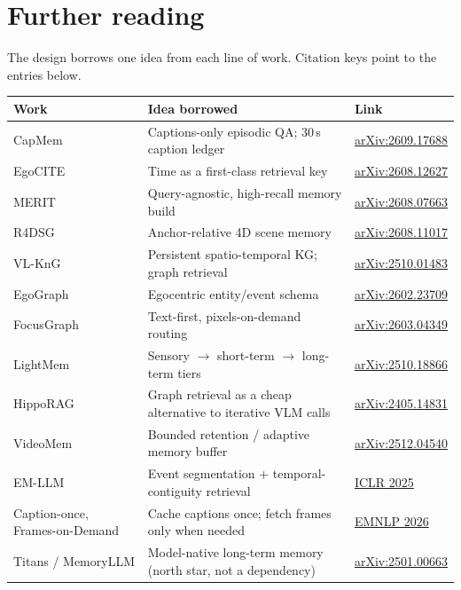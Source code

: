 \documentclass[10pt,a4paper]{article}
\begin{document}
\section{Further reading}

The design borrows one idea from each line of work. Citation keys point to the entries below.

\begin{center}
\small
\begin{tabularx}{\linewidth}{@{}l L l@{}}
\toprule
\textbf{Work} & \textbf{Idea borrowed} & \textbf{Link} \\
\midrule
CapMem & Captions-only episodic QA; 30\,s caption ledger & \href{https://arxiv.org/abs/2609.17688}{arXiv:2609.17688} \\
EgoCITE & Time as a first-class retrieval key & \href{https://arxiv.org/pdf/2608.12627v2}{arXiv:2608.12627} \\
MERIT & Query-agnostic, high-recall memory build & \href{https://arxiv.org/abs/2608.07663}{arXiv:2608.07663} \\
R4DSG & Anchor-relative 4D scene memory & \href{https://arxiv.org/abs/2608.11017}{arXiv:2608.11017} \\
VL-KnG & Persistent spatio-temporal KG; graph retrieval & \href{https://arxiv.org/abs/2510.01483}{arXiv:2510.01483} \\
EgoGraph & Egocentric entity/event schema & \href{https://arxiv.org/abs/2602.23709}{arXiv:2602.23709} \\
FocusGraph & Text-first, pixels-on-demand routing & \href{https://arxiv.org/abs/2603.04349}{arXiv:2603.04349} \\
LightMem & Sensory \(\to\) short-term \(\to\) long-term tiers & \href{https://arxiv.org/abs/2510.18866}{arXiv:2510.18866} \\
HippoRAG & Graph retrieval as a cheap alternative to iterative VLM calls & \href{https://arxiv.org/abs/2405.14831}{arXiv:2405.14831} \\
VideoMem & Bounded retention / adaptive memory buffer & \href{https://arxiv.org/abs/2512.04540}{arXiv:2512.04540} \\
EM-LLM & Event segmentation + temporal-contiguity retrieval & \href{https://proceedings.iclr.cc/paper_files/paper/2025/hash/c05144b635df16ac9bbf8246bbbd55ca-Abstract-Conference.html}{ICLR 2025} \\
Caption-once, Frames-on-Demand & Cache captions once; fetch frames only when needed & \href{https://aclanthology.org/2026.emnlp-main.422.pdf}{EMNLP 2026} \\
Titans / MemoryLLM & Model-native long-term memory (north star, not a dependency) & \href{https://arxiv.org/abs/2501.00663}{arXiv:2501.00663} \\
\bottomrule
\end{tabularx}
\end{center}
\end{document}
